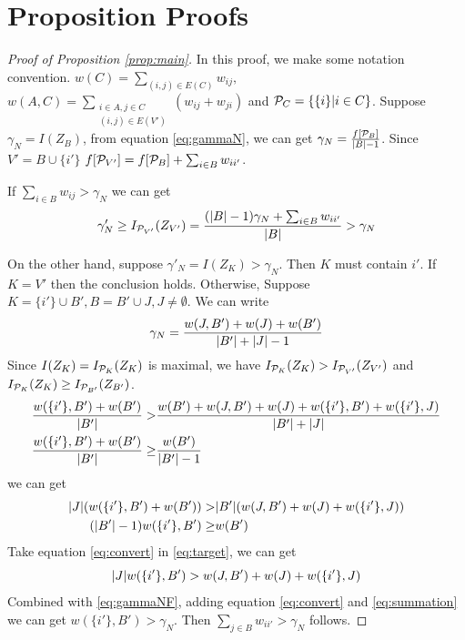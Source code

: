 \documentclass[runningheads]{llncs}
\begin{document}
\section{Proposition Proofs}
\begin{proof}[Proof of Proposition \ref{prop:main}]
		In this proof, we make some notation convention.
		$w(C) = \displaystyle\sum_{(i,j) \in E(C)} w_{ij},$
		$w(A, C) = \displaystyle\sum_{\substack{i \in A, j \in C \\ (i,j) \in E(V')}} (w_{ij}+w_{ji})$ and
		$\P_C = \{\{i \}| i \in C \}$. Suppose $\gamma_N = I(Z_B)$, from equation \eqref{eq:gammaN}, we can get $\gamma_N =\frac{f[\P_B]} {\abs{B} -1}$.
		Since $V' = B \cup \{i'\}$
		$f[\P_{V'}] = f[\P_B] + \sum_{i \in B}w_{ii'}$.
		
		If $ \sum_{i \in B} w_{ij} > \gamma_N$ we can get
		$$
		\gamma'_N \geq I_{\P_{V'}}(Z_{V'}) = \frac{(\abs{B}-1)\gamma_N + \sum_{i \in B}w_{ii'}}{\abs{B}} > \gamma_N
		$$
		
		On the other hand, suppose $\gamma'_N = I(Z_K) > \gamma_N$. Then $K$ must contain $i'$. If $K=V'$ then the conclusion holds. Otherwise, Suppose $K = \{i'\} \cup B', B=B'\cup J, J\neq \emptyset$. We can write 
		\begin{equation}\label{eq:gammaNF}
		\gamma_N = \frac{w(J,B') + w(J) + w(B')}{ \abs{B'} + \abs{J} - 1 }
		\end{equation}
		Since $I(Z_K) = I_{\P_K}(Z_K)$ is maximal, we have $I_{\P_K}(Z_K) > I_{\P_{V'}}(Z_{V'})$ and $I_{\P_K}(Z_K) \geq I_{\P_{B'}}(Z_{B'})$.
		\begin{align*}
			\frac{w(\{i'\}, B') + w(B')}{\abs{B'}} >& \frac{w(B') + w(J, B') + w(J) + w(\{i'\}, B') + w(\{i'\}, J)}{\abs{B'} + \abs{J}}  \\
			\frac{w(\{i'\}, B') + w(B')}{\abs{B'}} \geq & \frac{w(B')}{\abs{B'} - 1}
		\end{align*}
		we can get 
		\begin{align}
			\abs{J} (w(\{i'\}, B') + w(B')) > & \abs{B'} (w(J, B') + w(J) + w(\{i'\}, J)) \label{eq:target}
			\\
			(\abs{B'} - 1)  w(\{i'\}, B') \geq & w(B') \label{eq:convert}
		\end{align}
		Take equation \eqref{eq:convert} in \eqref{eq:target}, we can get
		\begin{equation}\label{eq:summation}
		\abs{J} w(\{i'\}, B') > w(J, B') + w(J) + w(\{i'\}, J)
		\end{equation}	
		Combined with \eqref{eq:gammaNF}, adding equation \eqref{eq:convert} and \eqref{eq:summation} we can get
		$w(\{i'\}, B') > \gamma_N$. Then $\sum_{j \in B}w_{ii'} > \gamma_N $ follows.
\end{proof}	
\end{document}
